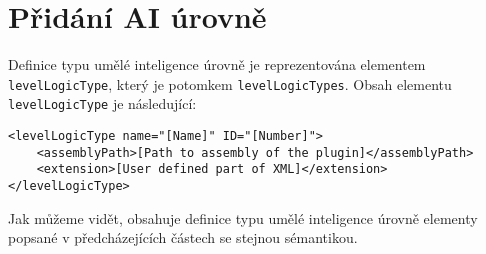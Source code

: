 \section{Přidání AI úrovně}
Definice typu umělé inteligence úrovně je reprezentována elementem \texttt{levelLogicType}, který je potomkem \texttt{levelLogicTypes}. Obsah elementu \texttt{levelLogicType} je následující:

\begin{lstlisting}
<levelLogicType name="[Name]" ID="[Number]">
	<assemblyPath>[Path to assembly of the plugin]</assemblyPath>
	<extension>[User defined part of XML]</extension>
</levelLogicType>
\end{lstlisting}
Jak můžeme vidět, obsahuje definice typu umělé inteligence úrovně elementy popsané v předcházejících částech se stejnou sémantikou.


